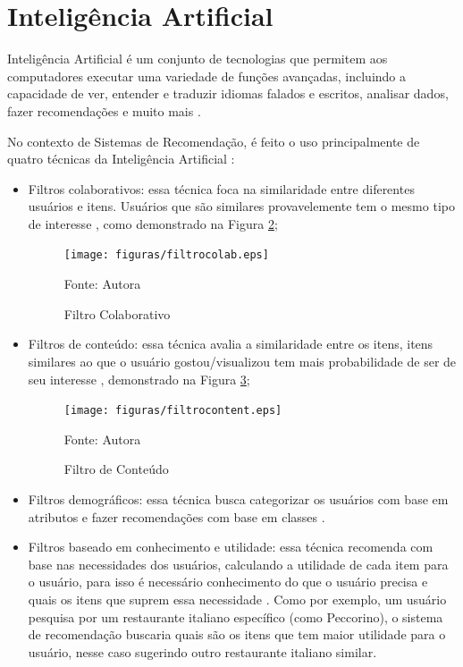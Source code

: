 \section{Inteligência Artificial}\label{sec:ia}

Inteligência Artificial é um conjunto de tecnologias que permitem aos computadores executar uma variedade de 
funções avançadas, incluindo a capacidade de ver, entender e traduzir idiomas falados e escritos, analisar dados, 
fazer recomendações e muito mais \cite{Suleimenov}.

No contexto de Sistemas de Recomendação, é feito o uso principalmente de quatro técnicas da Inteligência Artificial 
\cite{stratoflow-recommendation}:
\begin{itemize}
\item Filtros colaborativos: essa técnica foca na similaridade entre diferentes usuários e itens. Usuários que são
similares provavelemente tem o mesmo tipo de interesse \cite{pham2019recommendation}, como demonstrado na Figura 
\hyperref[fig:filtrocolab]{2};

\begin{figure}[htbp]
    \centering
    \texttt{[image: figuras/filtrocolab.eps]}
    \caption{Filtro Colaborativo}
    \label{fig:filtrocolab}
    \small Fonte: Autora
\end{figure}

\item Filtros de conteúdo: essa técnica avalia a similaridade entre os itens, itens similares ao que o usuário gostou/visualizou
tem mais probabilidade de ser de seu interesse \cite{stratoflow-recommendation}, demonstrado na Figura 
\hyperref[fig:filtrocont]{3};

\begin{figure}[htbp]
    \centering
    \texttt{[image: figuras/filtrocontent.eps]}
    \caption{Filtro de Conteúdo}
    \label{fig:filtrocont}
    \small Fonte: Autora
\end{figure}

\item Filtros demográficos: essa técnica busca categorizar os usuários com base em atributos e fazer recomendações
com base em classes \cite{burke2002hybrid}. 

\item Filtros baseado em conhecimento e utilidade: essa técnica recomenda com base nas necessidades dos usuários, 
calculando a utilidade de cada item para o usuário, para isso é necessário conhecimento do que o usuário precisa e 
quais os itens que suprem essa necessidade \cite{burke2002hybrid}. Como por exemplo, um usuário pesquisa por um restaurante
italiano específico (como Peccorino), o sistema de recomendação buscaria quais são os itens que tem maior utilidade para 
o usuário, nesse caso sugerindo outro restaurante italiano similar.


\end{itemize}

